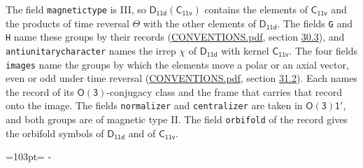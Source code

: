 \documentclass[10pt,a4paper]{article}
\newcommand{\needspace}[1]{\par\penalty-100\begingroup\dimen0=#1\relax\dimen2=\pagegoal
  \advance\dimen2-\pagetotal\ifdim\dimen0>\dimen2\relax\ifdim\dimen2>0pt\vfil\break\fi\fi
  \endgroup}
\numberwithin{equation}{section}
\newcommand{\grp}[1]{\mathsf{#1}}
\begin{document}
The field \texttt{magnetictype} is III, so $\grp{D_{11d}}(\grp{C_{11v}})$ contains the elements of $\grp{C_{11v}}$ and the products of time reversal $\varTheta$ with the other elements of $\grp{D_{11d}}$. The fields \texttt{G} and \texttt{H} name these groups by their records (\href{../../CONVENTIONS.pdf}{CONVENTIONS.pdf}, section \href{../../CONVENTIONS.pdf\#conv.30.3}{30.3}), and \texttt{antiunitarycharacter} names the irrep $\chi$ of $\grp{D_{11d}}$ with kernel $\grp{C_{11v}}$. The four fields \texttt{images} name the groups by which the elements move a polar or an axial vector, even or odd under time reversal (\href{../../CONVENTIONS.pdf}{CONVENTIONS.pdf}, section \href{../../CONVENTIONS.pdf\#conv.31.2}{31.2}). Each names the record of its $\grp{O(3)}$-conjugacy class and the frame that carries that record onto the image. The fields \texttt{normalizer} and \texttt{centralizer} are taken in $\grp{O(3)1'}$, and both groups are of magnetic type II. The field \texttt{orbifold} of the record gives the orbifold symbols of $\grp{D_{11d}}$ and of $\grp{C_{11v}}$.
\needspace{103pt}
\end{document}

